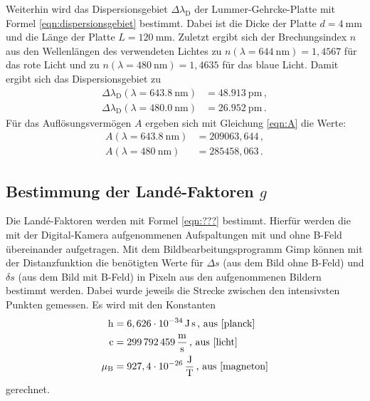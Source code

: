 	Weiterhin wird das Dispersionsgebiet $\Delta \lambda_{\mathrm{D}}$ der
	Lummer-Gehrcke-Platte mit Formel
	\eqref{eqn:dispersionsgebiet} bestimmt. Dabei ist die Dicke der Platte $d=\SI{4}{\milli\meter}$
	und die Länge der Platte  $L = \SI{120}{\milli\meter}$. Zuletzt ergibt sich der
	Brechungsindex $n$ aus den Wellenlängen des verwendeten Lichtes zu
	$n(\lambda=\SI{644}{\nano\meter}) = 1,4567$ für das rote Licht und zu
	$n(\lambda=\SI{480}{\nano\meter}) = 1,4635$ für das blaue Licht. Damit ergibt sich
	das Dispersionsgebiet zu
	\begin{align*}
		\Delta \lambda_{\mathrm{D}}(\lambda=\SI{643.8}{\nano\meter}) &= \SI{48.913}{\pico\meter} \, \mathrm{,} \\
		\Delta \lambda_{\mathrm{D}}(\lambda=\SI{480.0}{\nano\meter}) &= \SI{26.952}{\pico\meter} \, \mathrm{.}
	\end{align*}
	Für das Auflösungsvermögen $A$ ergeben sich mit Gleichung \eqref{eqn:A} die Werte:
\begin{align*}
	A(\lambda=\SI{643.8}{\nano\meter}) &= 209063,644 \, \mathrm{,} \\
	A(\lambda=\SI{480}{\nano\meter}) &= 285458,063 \, \mathrm{.}
\end{align*}

\subsection{Bestimmung der Landé-Faktoren $g$}
	Die Landé-Faktoren werden mit Formel \eqref{eqn:???} bestimmt. Hierfür werden die mit der
	Digital-Kamera aufgenommenen Aufspaltungen mit und ohne B-Feld übereinander aufgetragen.
	Mit dem Bildbearbeitungsprogramm Gimp \cite{gimp} können mit der Distanzfunktion
	die benötigten
	Werte für $\Delta s$ (aus dem Bild ohne B-Feld) und $\delta s$ (aus dem Bild mit B-Feld)
	in Pixeln aus den aufgenommenen Bildern bestimmt werden. Dabei wurde jeweils die 
	Strecke zwischen den intensivsten Punkten gemessen. 
	Es wird mit den Konstanten
	\begin{align*}
		\mathrm{h} &= 6,626 \cdot 10^{-34} \, \si{\joule\second} \, \text{, aus \cite{planck}} \\
		\mathrm{c} &= \SI{299792459}{\meter\per\second}\, \text{, aus \cite{licht}} \\
		\mu_{\mathrm{B}} &= 927,4 \cdot 10^{-26} \, \si{\joule\per\tesla} \, \text{, aus \cite{magneton}}
	\end{align*}
	gerechnet.
	\FloatBarrier
